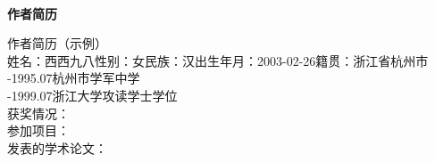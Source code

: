 \newpage
{}

\begin{center}
    ~\\[-1.5em]
    \textbf{作者简历}
\end{center}


\noindent 作者简历（示例）\\
\noindent 姓名：西西九八\quad 性别：女\quad 民族：汉\quad 出生年月：2003-02-26\quad 籍贯：浙江省杭州市 \\
-1995.07\qquad 杭州市学军中学 \\
-1999.07\qquad 浙江大学攻读学士学位 \\
\noindent 获奖情况：\\
\noindent 参加项目：\\
\noindent 发表的学术论文：\\
